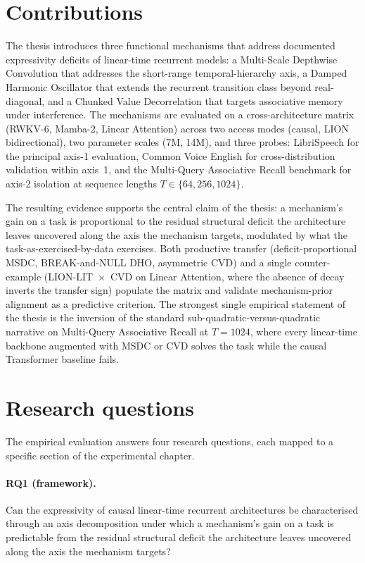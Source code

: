 \section{Contributions}

The thesis introduces three functional mechanisms that address
documented expressivity deficits of linear-time recurrent
models: a Multi-Scale Depthwise Convolution that addresses the
short-range temporal-hierarchy axis, a Damped Harmonic
Oscillator that extends the recurrent transition class beyond
real-diagonal, and a Chunked Value Decorrelation that targets
associative memory under interference. The mechanisms are
evaluated on a cross-architecture matrix (RWKV-6, Mamba-2,
Linear Attention) across two access modes (causal, LION
bidirectional), two parameter scales (7M, 14M), and three
probes: LibriSpeech for the principal axis-1 evaluation, Common
Voice English for cross-distribution validation within axis~1,
and the Multi-Query Associative Recall benchmark for axis-2
isolation at sequence lengths $T \in \{64, 256, 1024\}$.

The resulting evidence supports the central claim of the thesis:
a mechanism's gain on a task is proportional to the residual
structural deficit the architecture leaves uncovered along the
axis the mechanism targets, modulated by what the
task-as-exercised-by-data exercises. Both productive transfer
(deficit-proportional MSDC, BREAK-and-NULL DHO, asymmetric CVD)
and a single counter-example (LION-LIT~$\times$~CVD on Linear
Attention, where the absence of decay inverts the transfer sign)
populate the matrix and validate mechanism-prior alignment as a
predictive criterion. The strongest single empirical statement
of the thesis is the inversion of the standard
sub-quadratic-versus-quadratic narrative on Multi-Query
Associative Recall at $T = 1024$, where every linear-time
backbone augmented with MSDC or CVD solves the task while the
causal Transformer baseline fails.

\section{Research questions}\label{sec:intro:rqs}

The empirical evaluation answers four research questions, each
mapped to a specific section of the experimental chapter.

\paragraph{RQ1 (framework).} Can the expressivity of causal
linear-time recurrent architectures be characterised through an
axis decomposition under which a mechanism's gain on a task is
predictable from the residual structural deficit the
architecture leaves uncovered along the axis the mechanism
targets?

